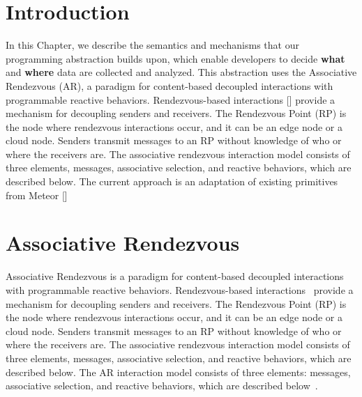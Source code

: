\section{Introduction}

In this Chapter, we describe the semantics and mechanisms that our programming abstraction builds upon, which enable
developers to decide \textbf{what} and \textbf{where} data are collected and analyzed. This abstraction uses the Associative Rendezvous (AR), a paradigm for content-based decoupled interactions with programmable reactive behaviors. Rendezvous-based interactions [] provide a mechanism for decoupling senders and receivers. The Rendezvous Point (RP) is the node where rendezvous interactions occur, and it can be an edge node or a cloud node. Senders transmit messages to an RP without knowledge of who or where the receivers are. The associative rendezvous interaction model consists of three elements, messages, associative selection, and reactive behaviors, which are described below. The current approach is an adaptation of existing primitives from Meteor []

\section{Associative Rendezvous} 
Associative Rendezvous is a paradigm for content-based decoupled interactions with programmable reactive behaviors. Rendezvous-based interactions~\cite{AR} provide a mechanism for decoupling senders and receivers. The Rendezvous Point (RP) is the node where rendezvous interactions occur, and it can be an edge node or a cloud node. Senders transmit messages to an RP without knowledge of who or where the receivers are. The associative rendezvous interaction model consists of three elements, messages, associative selection, and reactive behaviors, which are described below. The AR interaction model consists of three elements: messages, associative selection, and reactive behaviors, which are described below~\cite{meteor2008}.

